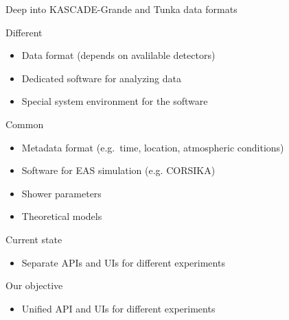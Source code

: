\documentclass[18pt]{beamer}
\begin{document}
\begin{frame}{Deep into KASCADE-Grande and Tunka data formats}
\vspace{-2em}
\begin{minipage}[t]{0.48\textwidth}
  \begin{block}{Different}
    \begin{itemize}
      \item Data format (depends on avalilable detectors)
      \item Dedicated software for analyzing data
      \item Special system environment for the software
    \end{itemize}
    \vspace{1em}
  \end{block}
\end{minipage}
\hfill
\begin{minipage}[t]{0.48\textwidth}
  \begin{block}{Common}
    \begin{itemize}
      \item Metadata format (e.g.\ time, location, atmospheric conditions)
      \item Software for EAS simulation (e.g. CORSIKA)
      \item Shower parameters
      \item Theoretical models
    \end{itemize}
  \end{block}
\end{minipage}


\begin{minipage}[t]{0.48\textwidth}
  \begin{exampleblock}{Current state}
    \begin{itemize}
      \item Separate APIs and UIs for different experiments
    \end{itemize}
  \end{exampleblock}
\end{minipage}
\hfill
\begin{minipage}[t]{0.48\textwidth}
  \begin{exampleblock}{Our objective}
    \begin{itemize}
      \item Unified API and UIs for different experiments
    \end{itemize}
  \end{exampleblock}
\end{minipage}
\end{frame}
\end{document}
